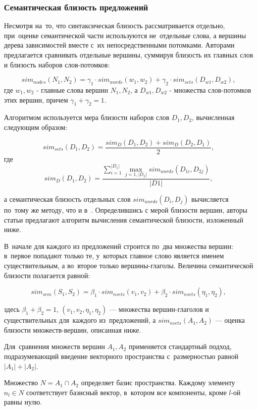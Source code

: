 \subsubsection{Семантическая близость предложений}
\label{sec:semantic_similarity}
Несмотря на~то, что синтаксическая близость рассматривается отдельно, 
при~оценке семантической части используются не~отдельные слова, 
а вершины дерева зависимостей вместе с~их непосредственными потомками.
Авторами предлагается сравнивать отдельные вершины, суммируя близость их главных слов и близость наборов слов-потомков:

$$ sim_{nodes}(N_1, N_2) = \gamma_1 \cdot sim_{words}(w_1,w_2) + \gamma_2 \cdot sim_{sets}(D_{w1}, D_{w2}), $$
где $w_1, w_2$ - главные слова вершин $N_1, N_2$, а $D_{w1}, D_{w2}$ - множества слов-потомков этих вершин,
причем $\gamma_1+\gamma_2=1$.

Алгоритмом используется мера близости наборов слов $D_1,D_2$, вычисленная следующим образом:

$$sim_{sets}(D_1, D_2) = \frac{sim_{D}(D_1,D_2) + sim_{D}(D_2, D_1)}{2}, $$
где 
$$sim_{D}(D_1, D_2) = \frac{ \sum \limits_{i=1}^{|D_1|} \max_{j=1,|D_2|} sim_{words}(D_{1i}, D_{2j}) } { |D1| },$$

а семантическая близость отдельных слов $sim_{words}(D_i, D_j)$ вычисляется по~тому же методу, что и в~\cite{wordnetSim}.
Определившись с мерой близости вершин, авторы статьи предлагают 
алгоритм вычисления семантической близости, изложенный ниже.

В~начале для каждого из предложений строится по~два множества вершин:
в~первое попадают только те, у~которых главное слово является именем существительным,
а во~второе только вершины-глаголы.
Величина семантической близости полагается равной:

$$sim_{sem}(S_1 , S_2) = \beta_1 \cdot sim_{nsets}(v_1, v_2) + \beta_2 \cdot sim_{nsets}(\eta_1, \eta_2), $$

здесь 
$\beta_1 + \beta_2 = 1$, 
$(v_1, v_2, \eta_1, \eta_2)$ --- множества  вершин-глаголов и существительных для~каждого из~предложений,
а $sim_{nsets}(A_1,A_2)$ --- оценка близости множеств-вершин, описанная ниже.

Для~сравнения множеств вершин $A_1,A_2$ применяется стандартный подход,
подразумевающий введение векторного пространства с~размерностью равной $|A_1|+|A_2|$.

Множество $ N = A_1 \cap A_2 $ определяет базис пространства.
Каждому элементу $n_l \in N $ соответствует базисный вектор, в~котором
все компоненты, кроме $l$-ой равны нулю.

